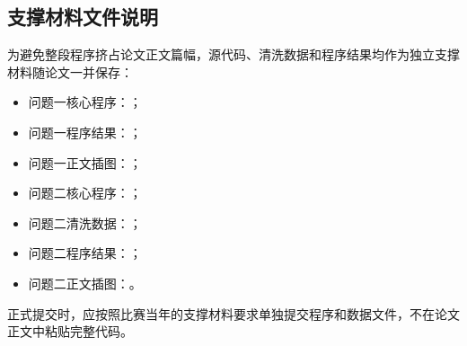 \documentclass[UTF8,a4paper,12pt,fontset=fandol]{ctexart}
\begin{document}
\newpage
\begin{appendices}

\section{支撑材料文件说明}
为避免整段程序挤占论文正文篇幅，源代码、清洗数据和程序结果均作为独立支撑材料随论文一并保存：
\begin{itemize}
  \item 问题一核心程序：；
  \item 问题一程序结果：；
  \item 问题一正文插图：；
  \item 问题二核心程序：；
  \item 问题二清洗数据：；
  \item 问题二程序结果：；
  \item 问题二正文插图：。
\end{itemize}
正式提交时，应按照比赛当年的支撑材料要求单独提交程序和数据文件，不在论文正文中粘贴完整代码。

\end{appendices}
\end{document}
